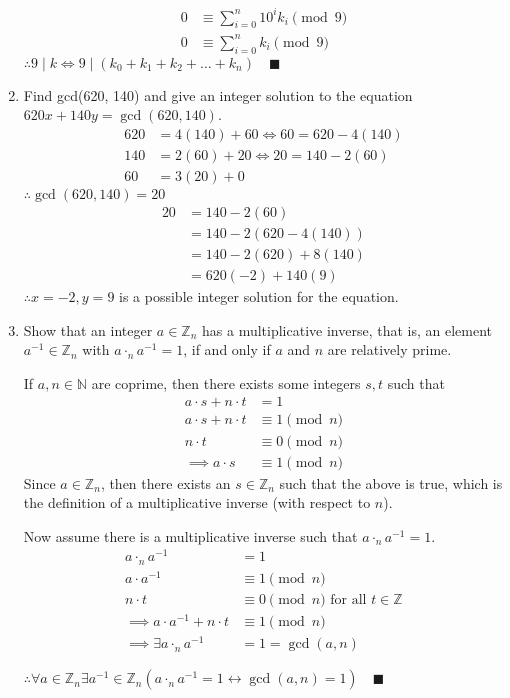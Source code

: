 \documentclass[letterpaper, 12pt]{article}
\newcommand{\qed}{\quad \blacksquare}
\newcommand{\bithen}{\leftrightarrow}
\newcommand{\N}{\mathbb{N}}
\newcommand{\Z}{\mathbb{Z}}
\newcommand{\0}{\emptyset}
\begin{document}
\begin{enumerate}
\begin{align*}
        0 &\equiv \sum_{i=0}^{n} 10^ik_i \pmod 9 \\
        0 &\equiv \sum_{i=0}^{n} k_i \pmod 9
    \end{align*}
    $\therefore 9 \mid k \iff 9 \mid (k_0 + k_1 + k_2 + \dots + k_n) \qed$
\item Find gcd(620, 140) and give an integer solution to the equation $620x + 140y = \gcd(620, 140)$.
\begin{align*}
    620 &= 4(140) + 60 \iff 60 = 620 - 4(140) \\
    140 &= 2(60) + 20 \iff 20 = 140 - 2(60) \\
    60 &= 3(20) + 0
\end{align*}
$\therefore \gcd(620, 140) = 20$
\begin{align*}
    20 &= 140 - 2(60) \\
    &= 140 - 2(620 - 4(140)) \\
    &= 140 - 2(620) + 8(140) \\
    &= 620(-2) + 140(9)
\end{align*}
$\therefore x = -2, y = 9$ is a possible integer solution for the equation.
\item Show that an integer $a \in \Z_n$ has a multiplicative inverse, that is, an element 
$a^{-1} \in \Z_n$ with $a \cdot_n a^{-1} = 1$, if and only if $a$ and $n$ are relatively prime.
\begin{flushleft}
    If $a, n \in \N$ are coprime, then there exists some integers $s, t$ such that
    \begin{align*}
        a \cdot s + n \cdot t &= 1 \\
        a \cdot s + n \cdot t &\equiv 1 \pmod n \\
        n \cdot t &\equiv 0 \pmod n \\
        \implies a \cdot s &\equiv 1 \pmod n
    \end{align*}
    Since $a \in \Z_n$, then there exists an $s \in \Z_n$ such that the above is true, which 
    is the definition of a multiplicative inverse (with respect to $n$).
\end{flushleft}
\begin{flushleft}
    Now assume  there is a multiplicative inverse such that $a \cdot_n a^{-1} = 1$.
    \begin{align*}
        a \cdot_n a^{-1} &= 1 \\
        a \cdot a^{-1} &\equiv 1 \pmod n \\
        n \cdot t &\equiv 0 \pmod n \text{ for all } t \in \Z \\
        \implies a \cdot a^{-1} + n \cdot t &\equiv 1 \pmod n \\
        \implies \exists a \cdot_n a^{-1} &= 1 = \gcd(a, n)
    \end{align*}
\end{flushleft}
$\therefore \forall a \in \Z_n \exists a^{-1} \in \Z_n 
(a \cdot_n a^{-1} = 1 \bithen \gcd(a, n) = 1) \qed$
\end{enumerate}
\end{document}
